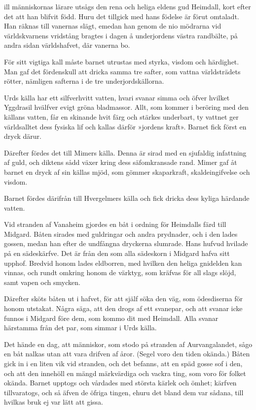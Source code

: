 \endSecII


\dropcapT ill människornas lärare utsågs den rena och heliga eld\-ens gud Heimdall,
kort efter det att han blifvit född. Huru det tillgick med hans födelse
är förut omtaladt. Han räknas till vanernas slägt, emedan han genom de
nio mödrarna vid världskvarnens vridstång bragtes i dagen å underjordens
västra randbälte, på andra sidan världshafvet, där vanerna bo.

För sitt vigtiga kall måste barnet utrustas med styrka, visdom och
härdighet. Man gaf det fördenskull att dricka samma tre safter, som
vattna världsträdets rötter, nämligen safterna i de tre
underjordskällorna.

Urds källa har ett silfverhvitt vatten, hvari svanar simma och öfver
hvilket Yggdrasil hvälfver evigt gröna bladmassor. Allt, som kommer i
beröring med den källans vatten, får en skinande hvit färg och stärkes
underbart, ty vattnet ger världsalltet dess fysiska lif och kallas
därför »jordens kraft». Barnet fick först en dryck därur.

Därefter fördes det till Mimers källa. Denna är sirad med en sjufaldig
infattning af guld, och diktens sådd växer kring dess säfomkransade
rand. Mimer gaf åt barnet en dryck af sin källas mjöd, som gömmer
skaparkraft, skaldeingifvelse och visdom.

Barnet fördes därifrån till Hvergelmers källa och fick dricka dess
kyliga härdande vatten.

Vid stranden af Vanaheim gjordes en båt i ordning för Heimdalls färd
till Midgard. Båten sirades med guldringar och andra prydnader, och i
den lades gossen, medan han efter de undfångna dryckerna slumrade. Hans
hufvud hvilade på en sädeskärfve. Det är från den som alla sädeskorn i
Midgard hafva sitt upphof. Bredvid honom lades eldborren, med hvilken
den heliga gnidelden kan vinnas, och rundt omkring honom de värktyg, som
kräfvas för all slags slöjd, samt vapen och smycken.

Därefter sköts båten ut i hafvet, för att själf söka den väg, som
ödesdiserna för honom utstakat. Några säga, att den drogs af ett
svanepar, och att svanar icke funnos i Midgard före dem, som kommo dit
med Heimdall. Alla svanar härstamma från det par, som simmar i Urds
källa.

Det hände en dag, att människor, som stodo på stranden af
Aurvangalandet, sågo en båt nalkas utan att vara drifven af åror. (Segel
voro den tiden okända.) Båten gick in i en liten vik vid stranden, och
det befanns, att en späd gosse sof i den, och att den innehöll en mängd
märkvärdiga och vackra ting, som voro för folket okända. Barnet upptogs
och vårdades med största kärlek och ömhet; kärfven tillvaratogs, och så
äfven de öfriga tingen, ehuru det bland dem var sådana, till hvilkas
bruk ej var lätt att gissa.


